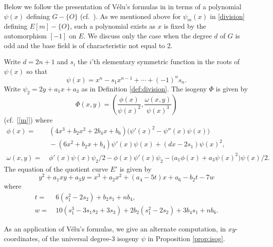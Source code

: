 \documentclass{gtpart}
\theoremstyle{definition}
\theoremstyle{remark}
\numberwithin{equation}{section}
\numberwithin{thm}{section}
\begin{document}
Below we follow the presentation of V\'elu's formulas in 
\cite[Section 2.4]{kohel} in terms of a polynomial $\psi(x)$ defining 
$G-\{O\}$ (cf.~\cite{dewaghe}).  As we mentioned above for $\psi_m(x)$ 
in \eqref{division} defining $E[m]-\{O\}$, such a polynomial exists as 
$x$ is fixed by the automorphism $[-1]$ on $E$.  We discuss only the 
case when the degree $d$ of $G$ is odd and the base field is of 
characteristic not equal to 2.  

Write $d = 2 n + 1$ and $s_i$ the $i$'th elementary symmetric function 
in the roots of $\psi(x)$ so that 
\[
 \psi(x) = x^n - s_1 x^{n-1} + \cdots + (-1)^n s_n.  
\]
Write $\psi_2 = 2 y + a_1 x + a_3$ as in Definition \ref{def:division}.  
The isogeny $\Phi$ is given by 
\[
 \Phi(x,y) = \left( \frac{\phi(x)}{\psi(x)^2}, 
 \frac{\omega(x,y)}{\psi(x)^3} \right) 
\]
(cf.~\eqref{[m]}) where 
\begin{equation*}
\begin{split}
     \phi(x) = & ~ (4 x^3 + b_2 x^2 + 2 b_4 x + b_6) \big( \psi'(x)^2 - \psi''(x) \psi(x) \big) \\
               & ~ - (6 x^2 + b_2 x + b_4) \psi'(x) \psi(x) + (d x - 2 s_1) \psi(x)^2, \\
 \omega(x,y) = & ~ \phi'(x) \psi(x) \psi_2 / 2 - \phi(x) \psi'(x) \psi_2 - \big( a_1 \phi(x) + a_3 \psi(x)^2 \big) \psi(x) / 2.  
\end{split}
\end{equation*}
The equation of the quotient curve $E'$ is given by 
\[
 y^2 + a_1 x y + a_3 y = x^3 + a_2 x^2 + (a_4 - 5 t) x + a_6 - b_2 t 
 - 7 w 
\]
where 
\begin{equation*}
\begin{split}
 t = & ~ 6 (s_1^2 - 2 s_2) + b_2 s_1 + n b_4, \\
 w = & ~ 10 (s_1^3 - 3 s_1 s_2 + 3 s_3) + 2 b_2 (s_1^2 - 2 s_2) + 3 b_4 s_1 + n b_6.  
\end{split}
\end{equation*}

As an application of V\'elu's formulas, we give an alternate 
computation, in $xy$-coordinates, of the universal degree-3 isogeny 
$\psi$ in Proposition \ref{prop:isog}.  
\end{document}
